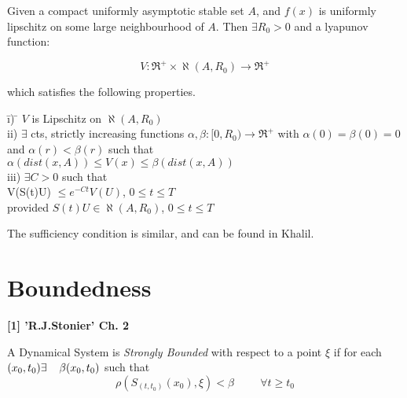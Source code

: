 \begin{therm}
  Given a compact uniformly asymptotic stable set $A$, and $f(x)$ is
  uniformly lipschitz on some large neighbourhood of $A$. Then $\exists
  R_{0} > 0$ and a lyapunov function:

  \[ V : \Re^{+} \times \aleph (A, R_{0}) \rightarrow \Re^{+} \]

  which satisfies the following properties.
  \begin{tabbing}
    \hspace{2cm} \= i) \hspace{5mm} \= $V$ is Lipschitz on
                        $\aleph(A,R_{0}) $ \\
    \> ii) \>  $\exists$ cts, strictly increasing functions $\alpha, \beta
      : [0,R_{0}) \rightarrow \Re^{+}$ with $\alpha (0) = \beta(0) = 0$ \\
    \> \> and $\alpha (r) < \beta(r)$ such that  \\
    \> \> \hspace{2cm} $\alpha (dist(x,A)) \leq V(x) \leq \beta(dist(x,A))
                      $ \\
    \> iii) \> $\exists C > 0$ such that \\
    \> \> \hspace{2cm} V(S(t)U) $\leq e^{-Ct} V(U)$, $0 \leq t \leq T$ \\
    \> \> provided $S(t)U \in \aleph (A, R_{0})$, $0 \leq t \leq T$ \\
  \end{tabbing}
  \label{yoshi}
\end{therm}

The sufficiency condition is similar, and can be found in Khalil.

\section{Boundedness}

{\bf [1] 'R.J.Stonier' Ch. 2}

\begin{defn}
  A Dynamical System is {\em Strongly Bounded} with respect to a point
  $\xi$ if for each $(x_{0},t_{0}) \exists \hspace{4mm} \beta
  (x_{0},t_{0})$ such that
  \[ \rho ( S_{(t,t_{0})}(x_{0}),\xi) < \beta \hspace{1cm} \forall t \geq
					  t_{0} \]
\end{defn}

